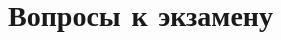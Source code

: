 \documentclass[a4paper]{article}
\begin{document}
  

  \section{Вопросы к экзамену}
  
\end{document}
